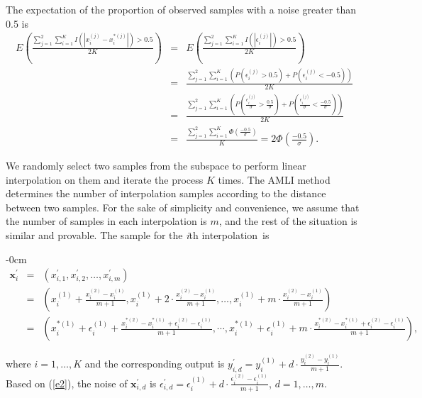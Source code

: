 \documentclass[mathematics,article,accept,pdftex,moreauthors]{Definitions/mdpi}
\begin{document}
The expectation of the proportion of observed samples with a noise greater than 0.5 is
\begin{eqnarray*}
	E(\frac{\sum_{j=1}^{2}\sum_{i=1}^{K}I(|x_{i}^{(j)}-x_{i}^{*(j)}|)>0.5}{2K})
	&=& 
	E(\frac{\sum_{j=1}^{2}\sum_{i=1}^{K}I(|\epsilon_{i}^{(j)}|)>0.5}{2K}) \\
	&=&
	\frac{\sum_{j=1}^{2}\sum_{i=1}^{K}(P(\epsilon_{i}^{(j)}>0.5)+P(\epsilon_{i}^{(j)}<-0.5))}{2K} \\
	&=&
	\frac{\sum_{j=1}^{2}\sum_{i=1}^{K}(P(\displaystyle{\frac{\epsilon_{i}^{(j)}}{\sigma}}>\frac{0.5}{\sigma})+P(\frac{\epsilon_{i}^{(j)}}{\sigma}<\frac{-0.5}{\sigma}))}{2K} \\
	&=&
	\frac{\sum_{j=1}^{2}\sum_{i=1}^{K}\Phi(\displaystyle{\frac{-0.5}{\sigma}})}{K} = 2\Phi(\displaystyle{\frac{-0.5}{\sigma}}).
\end{eqnarray*}

We randomly select two samples from the subspace to perform linear interpolation on them and iterate the process $K$ times. The AMLI method determines the number of interpolation samples according to the distance between two samples. For the sake of simplicity and convenience, we assume that the number of samples in each interpolation is $m$, and the rest of the situation is similar and provable. The sample for the \emph{i}{th} interpolation~is
\vspace{-21pt}
\begin{adjustwidth}{-\extralength}{0cm}%
\begin{eqnarray*}
	\bm{x}^{'}_{i} 
	&=& 
	(x_{i,1}^{'}, x_{i,2}^{'}, \ldots, x_{i,m}^{'}) \\
	&=&
	(x_{i}^{(1)} + \frac{x^{(2)}_{i} - x^{(1)}_{i}}{m+1}, x_{i}^{(1)}  + 2 \cdot \frac{x^{(2)}_{i} - x^{(1)}_{i}}{m+1}, \ldots, x_{i}^{(1)} + m \cdot \frac{x^{(2)}_{i} - x^{(1)}_{i}}{m+1})    \\
	&=&
	(x_{i}^{*(1)} + \epsilon_{i}^{(1)} + \frac{x^{*(2)}_{i} - x^{*(1)}_{i} + \epsilon_{i}^{(2)} -\epsilon_{i}^{(1)}}{m+1}, \cdots, 
	x_{i}^{*(1)} + \epsilon_{i}^{(1)} + m \cdot \frac{x^{*(2)}_{i} - x^{*(1)}_{i} + \epsilon_{i}^{(2)} -\epsilon_{i}^{(1)}}{m+1}), 
\end{eqnarray*}
\end{adjustwidth}
where $i = 1,\ldots,K$ and the corresponding output is $y_{i,d}^{'} = y_{i}^{(1)} + d \cdot \frac{y_{i}^{(2)} - y_{i}^{(1)}}{m+1}$. Based on (\ref{e2}), the noise of $\bm{x}_{i,d}^{'}$ is $\epsilon_{i,d}^{'} = \epsilon_{i}^{(1)} + d \cdot \displaystyle{\frac{\epsilon_{i}^{(2)} - \epsilon_{i}^{(1)}}{m+1}}$, $d=1,\ldots,m.$
\end{document}
